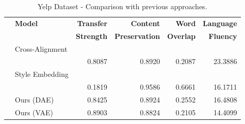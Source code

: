 \documentclass[11pt,a4paper]{article}
\begin{document}
\begin{table}[ht!]
	\centering
	\begin{tabular}{| c | l | r | r | r | r |}
		\hline
		\multirow{2}{*}{
		} & \textbf{Model}        & \textbf{Transfer} & \textbf{Content}      & \textbf{Word}    & \textbf{Language} \\
		  &                       & \textbf{Strength} & \textbf{Preservation} & \textbf{Overlap} & \textbf{Fluency}  \\
		\hline
		\hline
		\multirow{2}{*}{
		} & Cross-Alignment       &                   &                       &                  &                   \\
		  & \citep{shen2017style} & 0.8087            & 0.8920                & 0.2087           & 23.3886           \\
		\hline
		\multirow{2}{*}{
		} & Style Embedding       &                   &                       &                  &                   \\
		  & \citep{fu2017style}   & 0.1819            & 0.9586                & 0.6661           & 16.1711           \\
		\hline
		  & Ours (DAE)            & 0.8425            & 0.8924                & 0.2552           & 16.4808           \\
		\hline
		  & Ours (VAE)            & 0.8903            & 0.8824                & 0.2105           & 14.4099           \\
		\hline
	\end{tabular}
	\caption{Yelp Dataset - Comparison with previous approaches.}
	\label{tab:yelp-comparison-previous}
\end{table}
\end{document}
